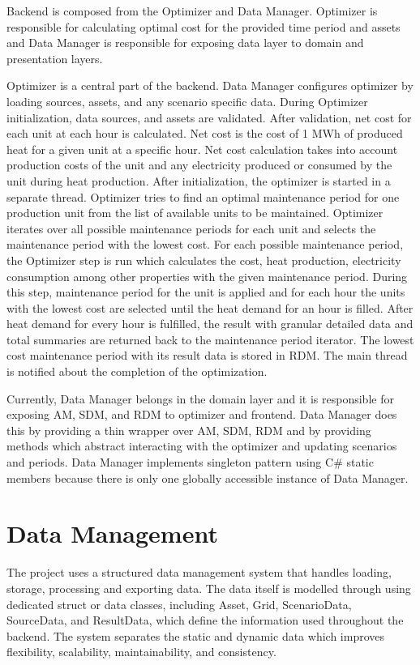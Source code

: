 Backend is composed from the Optimizer and Data Manager. Optimizer is responsible for calculating optimal cost for the provided time period and assets and Data Manager is responsible for exposing data layer to domain and presentation layers.\par
Optimizer is a central part of the backend. Data Manager configures optimizer by loading sources, assets, and any scenario specific data. During Optimizer initialization, data sources, and assets are validated. After validation, net cost for each unit at each hour is calculated. Net cost is the cost of 1 MWh of produced heat for a given unit at a specific hour. Net cost calculation takes into account production costs of the unit and any electricity produced or consumed by the unit during heat production. After initialization, the optimizer is started in a separate thread. Optimizer tries to find an optimal maintenance period for one production unit from the list of available units to be maintained. Optimizer iterates over all possible maintenance periods for each unit and selects the maintenance period with the lowest cost. For each possible maintenance period, the Optimizer step is run which calculates the cost, heat production, electricity consumption among other properties with the given maintenance period. During this step, maintenance period for the unit is applied and for each hour the units with the lowest cost are selected until the heat demand for an hour is filled. After heat demand for every hour is fulfilled, the result with granular detailed data and total summaries are returned back to the maintenance period iterator. The lowest cost maintenance period with its result data is stored in RDM. The main thread is notified about the completion of the optimization.\par
Currently, Data Manager belongs in the domain layer and it is responsible for exposing AM, SDM, and RDM to optimizer and frontend. Data Manager does this by providing a thin wrapper over AM, SDM, RDM and by providing methods which abstract interacting with the optimizer and updating scenarios and periods. Data Manager implements singleton pattern using C\# static members because there is only one globally accessible instance of Data Manager.

\section{Data Management}

The project uses a structured data management system that handles loading, storage, processing and exporting data. The data itself is modelled through using dedicated struct or data classes, including Asset, Grid, ScenarioData, SourceData, and ResultData, which define the information used throughout the backend. The system separates the static and dynamic data which improves flexibility, scalability, maintainability, and consistency.\par

